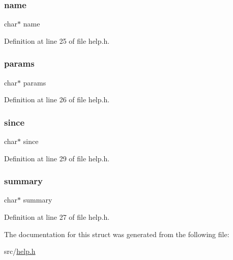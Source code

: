 \mbox{\label{structcommand_help_a5ac083a645d964373f022d03df4849c8}} 
\subsubsection{\texorpdfstring{name}{name}}
{\footnotesize\ttfamily char$\ast$ name}



Definition at line 25 of file help.\+h.

\mbox{\label{structcommand_help_a0d119d211b6770402e90c832e7d03767}} 
\subsubsection{\texorpdfstring{params}{params}}
{\footnotesize\ttfamily char$\ast$ params}



Definition at line 26 of file help.\+h.

\mbox{\label{structcommand_help_ae870034983eefc8a613f065adb0db99d}} 
\subsubsection{\texorpdfstring{since}{since}}
{\footnotesize\ttfamily char$\ast$ since}



Definition at line 29 of file help.\+h.

\mbox{\label{structcommand_help_a322a4c1fa51c3fb9a98f2d329a90ecfa}} 
\subsubsection{\texorpdfstring{summary}{summary}}
{\footnotesize\ttfamily char$\ast$ summary}



Definition at line 27 of file help.\+h.



The documentation for this struct was generated from the following file\+:\begin{DoxyCompactItemize}
\item 
src/\hyperlink{help_8h}{help.\+h}\end{DoxyCompactItemize}

